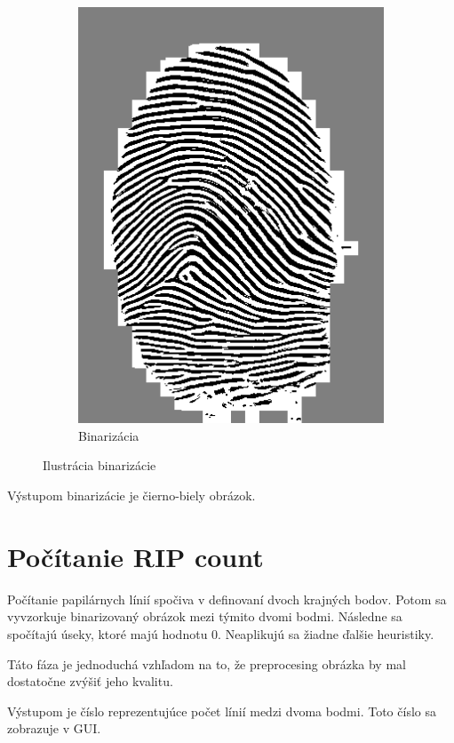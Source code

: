 \documentclass[11pt,a4paper]{article}
\begin{document}
\begin{figure}[h!]
\begin{subfigure}{0.40\textwidth}
		\includegraphics[width=.95\linewidth]{images/Screenshot_13}
		\caption{Binarizácia}
	\end{subfigure}%
	\caption{Ilustrácia binarizácie}\label{fig:9}
\end{figure}

Výstupom binarizácie je čierno-biely obrázok.

\section*{Počítanie RIP count}
Počítanie papilárnych línií spočiva v definovaní dvoch krajných bodov. Potom sa vyvzorkuje binarizovaný obrázok mezi týmito dvomi bodmi. Následne sa spočítajú úseky, ktoré majú hodnotu 0. Neaplikujú sa žiadne ďalšie heuristiky.

Táto fáza je jednoduchá vzhľadom na to, že preprocesing obrázka by mal dostatočne zvýšiť jeho kvalitu.

Výstupom je číslo reprezentujúce počet línií medzi dvoma bodmi. Toto číslo sa zobrazuje v GUI.
\end{document}
